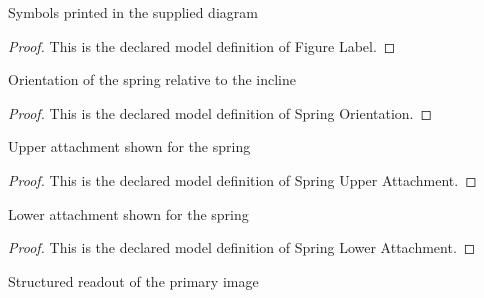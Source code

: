 \begin{definition}
  \label{def:physics:phyx-mini-0257:phyxminiproblems-problemphyxmini0257-figurelabel}
  Symbols printed in the supplied diagram
\end{definition}
\begin{proof}
  This is the declared model definition of Figure Label.
\end{proof}
\begin{definition}
  \label{def:physics:phyx-mini-0257:phyxminiproblems-problemphyxmini0257-springorientation}
  Orientation of the spring relative to the incline
\end{definition}
\begin{proof}
  This is the declared model definition of Spring Orientation.
\end{proof}
\begin{definition}
  \label{def:physics:phyx-mini-0257:phyxminiproblems-problemphyxmini0257-springupperattachment}
  Upper attachment shown for the spring
\end{definition}
\begin{proof}
  This is the declared model definition of Spring Upper Attachment.
\end{proof}
\begin{definition}
  \label{def:physics:phyx-mini-0257:phyxminiproblems-problemphyxmini0257-springlowerattachment}
  Lower attachment shown for the spring
\end{definition}
\begin{proof}
  This is the declared model definition of Spring Lower Attachment.
\end{proof}
\begin{definition}
  \label{def:physics:phyx-mini-0257:phyxminiproblems-problemphyxmini0257-suppliedfigure}
  Structured readout of the primary image
\end{definition}
